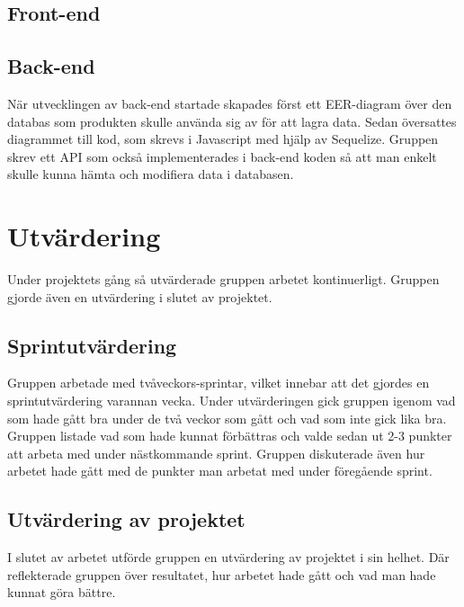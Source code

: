 \subsection{Front-end}

\subsection{Back-end}
När utvecklingen av back-end startade skapades först ett EER-diagram över den databas som produkten skulle använda sig av för att lagra data. 
Sedan översattes diagrammet till kod, som skrevs i Javascript med hjälp av Sequelize. 
Gruppen skrev ett API som också implementerades i back-end koden så att man enkelt skulle kunna hämta och modifiera data i databasen.

\section{Utvärdering}
Under projektets gång så utvärderade gruppen arbetet kontinuerligt. Gruppen gjorde även en utvärdering i slutet av projektet.

\subsection{Sprintutvärdering}
Gruppen arbetade med tvåveckors-sprintar, vilket innebar att det gjordes en sprintutvärdering varannan vecka. Under utvärderingen gick gruppen igenom vad som hade gått bra under de två veckor som gått och vad som inte gick lika bra. Gruppen listade vad som hade kunnat förbättras och valde sedan ut 2-3 punkter att arbeta med under nästkommande sprint. Gruppen diskuterade även hur arbetet hade gått med de punkter man arbetat med under föregående sprint.

\subsection{Utvärdering av projektet}
I slutet av arbetet utförde gruppen en utvärdering av projektet i sin helhet. Där reflekterade gruppen över resultatet, hur arbetet hade gått och vad man hade kunnat göra bättre.
